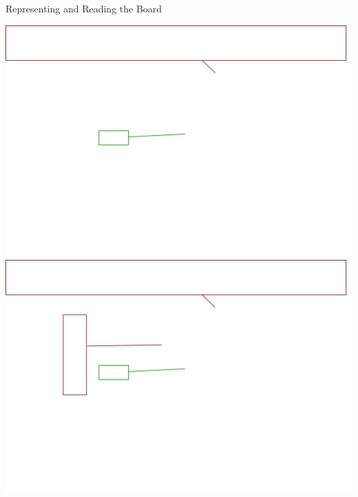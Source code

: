 \documentclass{beamer}
\begin{document}
\begin{frame}{Representing and Reading the Board}
\begin{overprint}
 \includegraphics[width=\textwidth]{parser7}
 \includegraphics[width=\textwidth]{parser8}
\end{overprint}
\end{frame}
\end{document}
